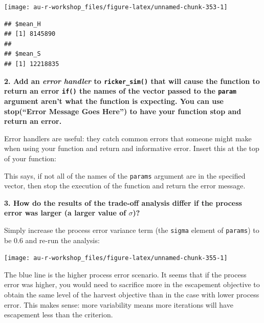 \documentclass[]{book}
\newenvironment{Shaded}{\begin{snugshade}}{\end{snugshade}}
\newcommand{\KeywordTok}[1]{\textcolor[rgb]{0.13,0.29,0.53}{\textbf{#1}}}
\newcommand{\StringTok}[1]{\textcolor[rgb]{0.31,0.60,0.02}{#1}}
\newcommand{\ControlFlowTok}[1]{\textcolor[rgb]{0.13,0.29,0.53}{\textbf{#1}}}
\newcommand{\OperatorTok}[1]{\textcolor[rgb]{0.81,0.36,0.00}{\textbf{#1}}}
\newcommand{\NormalTok}[1]{#1}
\theoremstyle{definition}
\theoremstyle{definition}
\theoremstyle{definition}
\theoremstyle{remark}
\begin{document}
\begin{center}\texttt{[image: au-r-workshop\_files/figure-latex/unnamed-chunk-353-1]} \end{center}

\begin{verbatim}
## $mean_H
## [1] 8145890
## 
## $mean_S
## [1] 12218835
\end{verbatim}

\textbf{2. Add an \emph{error handler} to \texttt{ricker\_sim()} that
will cause the function to return an error \texttt{if()} the names of
the vector passed to the \texttt{param} argument aren't what the
function is expecting. You can use stop(``Error Message Goes Here'') to
have your function stop and return an error.}

Error handlers are useful: they catch common errors that someone might
make when using your function and return and informative error. Insert
this at the top of your function:

\begin{Shaded}
\end{Shaded}

This says, if not all of the names of the \texttt{params} argument are
in the specified vector, then stop the execution of the function and
return the error message.

\textbf{3. How do the results of the trade-off analysis differ if the
process error was larger (a larger value of \(\sigma\))?}

Simply increase the process error variance term (the \texttt{sigma}
element of \texttt{params}) to be 0.6 and re-run the analysis:

\begin{center}\texttt{[image: au-r-workshop\_files/figure-latex/unnamed-chunk-355-1]} \end{center}

The blue line is the higher process error scenario. It seems that if the
process error was higher, you would need to sacrifice more in the
escapement objective to obtain the same level of the harvest objective
than in the case with lower process error. This makes sense: more
variability means more iterations will have escapement less than the
criterion.
\end{document}
